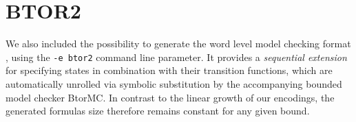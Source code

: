 \section{BTOR2}

\newcommand{\LPREV}{\rotatebox[origin=c]{180}{$\Lsh$}}
\newcommand{\RPREV}{\rotatebox[origin=c]{180}{$\Rsh$}}

We also included the possibility to generate the word level model checking format {\BTOR} \cite{ref:BTOR2}, using the \texttt{-e btor2} command line parameter.
It provides a \emph{sequential extension} for specifying %
states in combination with their transition functions,
which are automatically unrolled via symbolic substitution by the accompanying bounded model checker BtorMC.
In contrast to the linear growth of our {\SMTLIB} encodings, the generated formulas size therefore remains constant for any given bound. %
